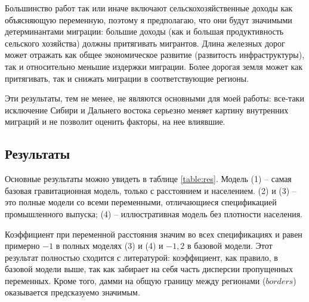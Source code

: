 \documentclass[a4paper,12pt]{article}
\begin{document}
Большинство работ так или иначе включают сельскохозяйственные доходы как объясняющую переменную, поэтому я предполагаю, что они будут значимыми детерминантами миграции: большие доходы (как и большая продуктивность сельского хозяйства) должны притягивать мигрантов. Длина железных дорог может отражать как общее экономическое развитие (развитость инфраструктуры), так и относительно меньшие издержки миграции. Более дорогая земля может как притягивать, так и снижать миграции в соответствующие регионы. 

Эти результаты, тем не менее, не являются основными для моей работы: все-таки исключение Сибири и Дальнего востока серьезно меняет картину внутренних миграций и не позволит оценить факторы, на нее влиявшие.

\subsection{Результаты}\label{sec:results}


Основные результаты можно увидеть в таблице \ref{table:res}. Модель (1) -- самая базовая гравитационная модель, только с расстоянием и населением. (2) и (3) -- это полные модели со всеми переменными, отличающиеся спецификацией промышленного выпуска; (4) -- иллюстративная модель без плотности населения.

Коэффициент при переменной расстояния значим во всех спецификациях и равен примерно $-1$ в полных моделях (3) и (4) и $-1,2$ в базовой модели. Этот результат полностью сходится с литературой: коэффициент, как правило, в базовой модели выше, так как забирает на себя часть дисперсии пропущенных переменных.  Кроме того, дамми на общую границу между регионами ($borders$) оказывается предсказуемо значимым. 

\afterpage{%
	
}\par
\end{document}
